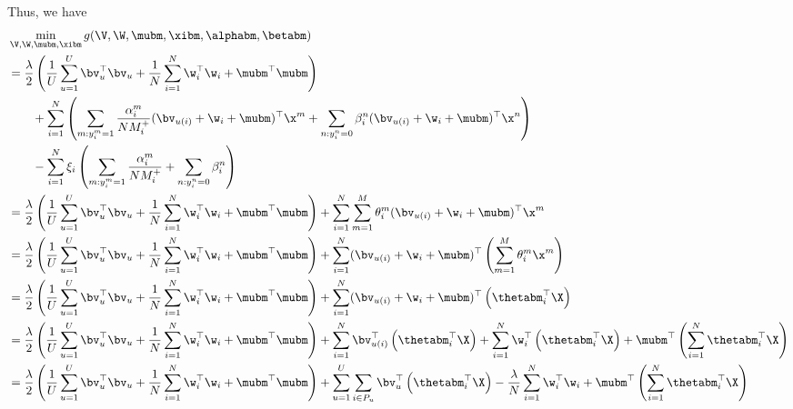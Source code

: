 Thus, we have
\begin{equation*}
\begin{aligned}
&\min_{\V, \W, \mubm, \xibm} g(\V, \W, \mubm, \xibm, \alphabm, \betabm) \\
&= \frac{\lambda}{2} \left( \frac{1}{U} \sum_{u=1}^U \bv_u^\top \bv_u 
     + \frac{1}{N} \sum_{i=1}^N \w_i^\top \w_i + \mubm^\top \mubm \right) \\
& \hspace{2em}
     + \sum_{i=1}^N \left( 
       \sum_{m: y_i^m = 1} \frac{\alpha_i^m}{N M_i^+} (\bv_{u(i)} + \w_i + \mubm)^\top \x^m 
     + \sum_{n: y_i^n = 0} \beta_i^n (\bv_{u(i)} + \w_i + \mubm)^\top \x^n \right) \\
& \hspace{2em}
     - \sum_{i=1}^N \xi_i \left( \sum_{m: y_i^m = 1} \frac{\alpha_i^m}{N M_i^+} + \sum_{n: y_i^n = 0} \beta_i^n \right) \\
&= \frac{\lambda}{2} \left( \frac{1}{U} \sum_{u=1}^U \bv_u^\top \bv_u 
     + \frac{1}{N} \sum_{i=1}^N \w_i^\top \w_i + \mubm^\top \mubm \right)
     + \sum_{i=1}^N \sum_{m=1}^M \theta_i^m (\bv_{u(i)} + \w_i + \mubm)^\top \x^m \\
&= \frac{\lambda}{2} \left( \frac{1}{U} \sum_{u=1}^U \bv_u^\top \bv_u 
     + \frac{1}{N} \sum_{i=1}^N \w_i^\top \w_i + \mubm^\top \mubm \right)
     + \sum_{i=1}^N (\bv_{u(i)} + \w_i + \mubm)^\top \left( \sum_{m=1}^M \theta_i^m \x^m \right) \\
&= \frac{\lambda}{2} \left( \frac{1}{U} \sum_{u=1}^U \bv_u^\top \bv_u 
     + \frac{1}{N} \sum_{i=1}^N \w_i^\top \w_i + \mubm^\top \mubm \right)
     + \sum_{i=1}^N (\bv_{u(i)} + \w_i + \mubm)^\top \left( \thetabm_i^\top \X \right) \\
&= \frac{\lambda}{2} \left( \frac{1}{U} \sum_{u=1}^U \bv_u^\top \bv_u 
     + \frac{1}{N} \sum_{i=1}^N \w_i^\top \w_i + \mubm^\top \mubm \right)
     + \sum_{i=1}^N \bv_{u(i)}^\top \left( \thetabm_i^\top \X \right) 
     + \sum_{i=1}^N \w_i^\top \left( \thetabm_i^\top \X \right) 
     + \mubm^\top \left( \sum_{i=1}^N \thetabm_i^\top \X \right) \\
&= \frac{\lambda}{2} \left( \frac{1}{U} \sum_{u=1}^U \bv_u^\top \bv_u 
     + \frac{1}{N} \sum_{i=1}^N \w_i^\top \w_i + \mubm^\top \mubm \right)
     + \sum_{u=1}^U \sum_{i \in P_u} \bv_u^\top \left( \thetabm_i^\top \X \right) 
     - \frac{\lambda}{N} \sum_{i=1}^N \w_i^\top \w_i 
     + \mubm^\top \left( \sum_{i=1}^N \thetabm_i^\top \X \right) \\
\end{aligned}
\end{equation*}
